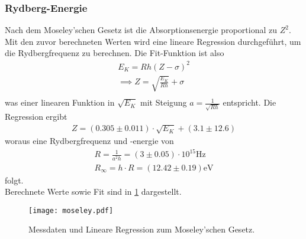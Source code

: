   \subsubsection{Rydberg-Energie}
    Nach dem Moseley'schen Gesetz ist die Absorptionsenergie proportional zu $Z^2$. Mit den zuvor 
    berechneten Werten wird eine lineare Regression durchgeführt, um die Rydbergfrequenz zu berechnen.
    Die Fit-Funktion ist also 
    \begin{align*}
      E_K = R h (Z - \sigma)^2\\
      \implies Z = \sqrt{\frac{E_K}{R h}} + \sigma\\
    \end{align*}
    was einer linearen Funktion in $\sqrt{E_K}$ mit Steigung $a = \frac{1}{\sqrt{R h}}$ entspricht.
    Die Regression ergibt
    \begin{align*}
      Z = (0.305 \pm 0.011) \cdot \sqrt{E_K} + (3.1 \pm 12.6)
    \end{align*}
    woraus eine Rydbergfrequenz und -energie von
    \begin{align*}
      R = \frac{1}{a^2 h} = (3 \pm 0.05) \cdot 10^{15} \si{\Hz}\\
      R_{\infty} = h \cdot R = (12.42 \pm 0.19) \text{eV}
    \end{align*}
    folgt.\\
    Berechnete Werte sowie Fit sind in \ref{fig:moseley} dargestellt.

    \begin{figure}
      \centering
      \texttt{[image: moseley.pdf]}
      \caption{Messdaten und Lineare Regression zum Moseley'schen Gesetz.}
      \label{fig:moseley}
    \end{figure}

    \FloatBarrier